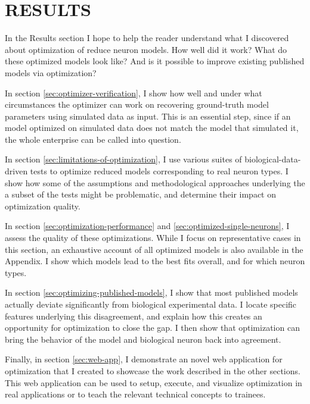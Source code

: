 \chapter{RESULTS}
In the Results section I hope to help the reader understand what I discovered about optimization of reduce neuron models.
How well did it work?
What do these optimized models look like?
And is it possible to improve existing published models via optimization?

In section \ref{sec:optimizer-verification}, I show how well and under what circumstances the optimizer can work on recovering ground-truth model parameters using simulated data as input.
This is an essential step, since if an model optimized on simulated data does not match the model that simulated it, the whole enterprise can be called into question.

In section \ref{sec:limitations-of-optimization}, I use various suites of biological-data-driven tests to optimize reduced models corresponding to real neuron types.
I show how some of the assumptions and methodological approaches underlying the a subset of the tests might be problematic, and determine their impact on optimization quality. 

In section \ref{sec:optimization-performance} and \ref{sec:optimized-single-neurons}, I assess the quality of these optimizations. 
While I focus on representative cases in this section, an exhaustive account of all optimized models is also available in the Appendix.
I show which models lead to the best fits overall, and for which neuron types.

In section \ref{sec:optimizing-published-models}, I show that most published models actually deviate significantly from biological experimental data.
I locate specific features underlying this disagreement, and explain how this creates an opportunity for optimization to close the gap.
I then show that optimization can bring the behavior of the model and biological neuron back into agreement.

Finally, in section \ref{sec:web-app}, I demonstrate an novel web application for optimization that I created to showcase the work described in the other sections.
This web application can be used to setup, execute, and visualize optimization in real applications or to teach the relevant technical concepts to trainees.


 


 






